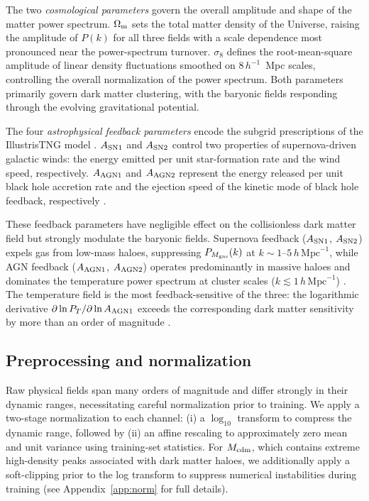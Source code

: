 \documentclass[usenatbib]{mnras}
\newcommand{\Mcdm}{M_{\rm cdm}}
\newcommand{\Mgas}{M_{\rm gas}}
\newcommand{\Tgas}{T}
\newcommand{\Om}{\Omega_{\rm m}}
\newcommand{\sig}{\sigma_8}
\begin{document}
The two \emph{cosmological parameters} govern the overall amplitude
and shape of the matter power spectrum.
$\Om$ sets the total matter density of the Universe, raising the
amplitude of $P(k)$ for all three fields with a scale dependence
most pronounced near the power-spectrum turnover.
$\sig$ defines the root-mean-square amplitude of linear density
fluctuations smoothed on $8\,h^{-1}$~Mpc scales, controlling the
overall normalization of the power spectrum.
Both parameters primarily govern dark matter clustering, with the
baryonic fields responding through the evolving gravitational
potential.

The four \emph{astrophysical feedback parameters} encode the
subgrid prescriptions of the IllustrisTNG model
\citep{Weinberger2017,Pillepich2018IllustrisTNG}.
$A_{\rm SN1}$ and $A_{\rm SN2}$ control two properties of
supernova-driven galactic winds: the energy emitted per unit
star-formation rate and the wind speed, respectively.
$A_{\rm AGN1}$ and $A_{\rm AGN2}$ represent the energy released per
unit black hole accretion rate and the ejection speed of the kinetic
mode of black hole feedback, respectively
\citep{Villaescusa2022}.

These feedback parameters have negligible effect on the collisionless
dark matter field but strongly modulate the baryonic fields.
Supernova feedback ($A_{\rm SN1}$, $A_{\rm SN2}$) expels gas from
low-mass haloes, suppressing $P_{\Mgas}(k)$ at
$k \sim 1$--$5\,h\,\mathrm{Mpc}^{-1}$, while AGN feedback
($A_{\rm AGN1}$, $A_{\rm AGN2}$) operates predominantly in massive
haloes and dominates the temperature power spectrum at cluster scales
($k \lesssim 1\,h\,\mathrm{Mpc}^{-1}$)
\citep{Villaescusa2022}.
The temperature field is the most feedback-sensitive of the three:
the logarithmic derivative
$\partial\ln P_\Tgas / \partial\ln A_{\rm AGN1}$ exceeds the
corresponding dark matter sensitivity by more than an order of
magnitude \citep{Villaescusa2022}.

\subsection{Preprocessing and normalization}
\label{sec:preprocessing}

Raw physical fields span many orders of magnitude and differ strongly in
their dynamic ranges, necessitating careful normalization prior to
training.
We apply a two-stage normalization to each channel:
(i) a $\log_{10}$ transform to compress the dynamic range, followed by
(ii) an affine rescaling to approximately zero mean and unit variance
using training-set statistics.
For $\Mcdm$, which contains extreme high-density peaks associated with
dark matter haloes, we additionally apply a soft-clipping prior to the
log transform to suppress numerical instabilities during training
(see Appendix~\ref{app:norm} for full details).
\end{document}
